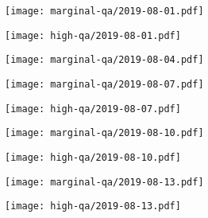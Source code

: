 \documentclass{article}
\begin{document}
\begin{figure}[H]
	\ContinuedFloat
	\centering
	\begin{subfigure}{0.48\linewidth}
		\texttt{[image: marginal-qa/2019-08-01.pdf]}
	\end{subfigure}
	\begin{subfigure}{0.48\linewidth}
		\texttt{[image: high-qa/2019-08-01.pdf]}
	\end{subfigure}
	\begin{subfigure}{\linewidth}
		\texttt{[image: marginal-qa/2019-08-04.pdf]}
	\end{subfigure}
	\begin{subfigure}{0.48\linewidth}
		\texttt{[image: marginal-qa/2019-08-07.pdf]}
	\end{subfigure}
	\begin{subfigure}{0.48\linewidth}
		\texttt{[image: high-qa/2019-08-07.pdf]}
	\end{subfigure}
	\begin{subfigure}{0.48\linewidth}
		\texttt{[image: marginal-qa/2019-08-10.pdf]}
	\end{subfigure}
	\begin{subfigure}{0.48\linewidth}
		\texttt{[image: high-qa/2019-08-10.pdf]}
	\end{subfigure}
	\begin{subfigure}{0.48\linewidth}
		\texttt{[image: marginal-qa/2019-08-13.pdf]}
	\end{subfigure}
	\begin{subfigure}{0.48\linewidth}
		\texttt{[image: high-qa/2019-08-13.pdf]}
	\end{subfigure}
\end{figure}
\end{document}
